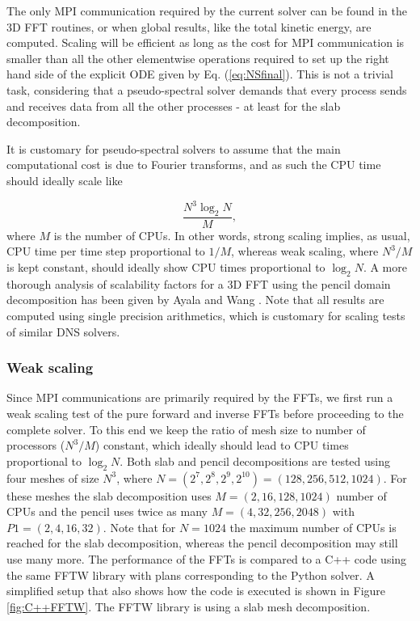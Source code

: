 \documentclass[final,3p,times,twocolumn]{elsarticle}
\begin{document}
The only MPI communication required by the current solver can be found in the 3D
FFT routines, or when global results, like the total kinetic energy, are
computed. Scaling will be efficient as long as the cost for MPI
communication is smaller than all the other elementwise operations required
to set up the right hand side of the explicit ODE given by Eq.
(\ref{eq:NSfinal}). This is not a trivial task, considering that a 
pseudo-spectral solver demands that every process sends and receives data
from all the other processes - at least for the slab decomposition.

It is customary for pseudo-spectral solvers to assume that the main computational cost is due to Fourier transforms, and as such the CPU time should ideally scale like

\begin{equation}
 \frac{N^3 \log_2 N}{M},
\end{equation}
where $M$ is the number of CPUs. In other words, strong scaling implies, as 
usual, CPU time per time step proportional to $1/M$, whereas weak scaling, 
where $N^3/M$ is kept constant, should ideally show CPU times proportional to 
$\log_2 N$. A more thorough analysis of scalability factors for a 3D FFT using 
the pencil domain decomposition has been given by Ayala and Wang 
\cite{ayala2013}. Note that all results are computed using single precision 
arithmetics, which is customary for scaling tests of similar DNS solvers. 

\subsubsection{Weak scaling}
Since MPI communications are primarily required by the FFTs, we first run a 
weak scaling test of the pure forward and inverse FFTs before proceeding to the 
complete solver. To this end we keep the ratio of mesh size to number of 
processors ($N^3/M$) constant, which ideally should lead to CPU times 
proportional to $\log_2 N$. Both slab and pencil decompositions are tested 
using four meshes of size $N^3$, where $N=(2^7, 2^8, 2^9, 2^{10}) =(128, 256, 
512, 1024)$. For these meshes the slab decomposition uses 
$M=(2, 16, 128, 1024)$ number of CPUs and the pencil uses twice as many $M=(4, 
32, 256, 2048)$ with $P1=(2, 4, 16, 32)$.
Note that for $N=1024$ the maximum number of CPUs is reached for the slab decomposition, whereas the pencil
decomposition may still use many more. The performance of the FFTs is compared 
to a C++ code using the same FFTW library with plans corresponding to the 
Python solver. A simplified setup that also shows how the code is executed is 
shown in Figure \ref{fig:C++FFTW}. The FFTW library is using a slab mesh 
decomposition.
\end{document}
